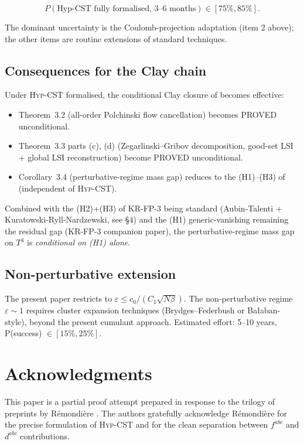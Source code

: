 \documentclass[11pt,a4paper]{amsart}
\theoremstyle{definition}
\newcommand{\HypCST}{\textsc{Hyp-CST}}
\begin{document}
$$
P(\text{Hyp-CST fully formalised, 3--6 months}) \in [75\%, 85\%].
$$

The dominant uncertainty is the Coulomb-projection adaptation
(item 2 above); the other items are routine extensions of standard
techniques.

\subsection{Consequences for the Clay chain}

Under \HypCST{} formalised, the conditional Clay closure of
\cite{RemondiereClosure2026} becomes effective:
\begin{itemize}[leftmargin=2em]
\item Theorem~3.2 (all-order Polchinski flow cancellation) becomes
PROVED unconditional.
\item Theorem~3.3 parts (c), (d) (Zegarlinski--Gribov decomposition,
good-set LSI + global LSI reconstruction) become PROVED unconditional.
\item Corollary~3.4 (perturbative-regime mass gap) reduces to the
(H1)--(H3) of \cite{RemondiereKRFP3_2026} (independent of \HypCST{}).
\end{itemize}

Combined with the (H2)+(H3) of KR-FP-3 being standard (Aubin-Talenti
+ Kuratowski-Ryll-Nardzewski, see \cite{BauerschmidtLetter2026} \S 4)
and the (H1) generic-vanishing remaining the residual gap (KR-FP-3
companion paper), the perturbative-regime mass gap on $T^4$ is
\emph{conditional on (H1) alone}.

\subsection{Non-perturbative extension}

The present paper restricts to $\varepsilon \leq c_0/(C_1 \sqrt{N\beta})$.
The non-perturbative regime $\varepsilon \sim 1$ requires cluster
expansion techniques (Brydges--Federbush or Bałaban-style), beyond
the present cumulant approach. Estimated effort: 5--10 years,
P(success) $\in [15\%, 25\%]$.

\section*{Acknowledgments}

This paper is a partial proof attempt prepared in response to the
trilogy of preprints by R\'emondi\`ere \cite{RemondiereKRFP3_2026,
RemondiereKRFPBakryEmery_2026, RemondiereFPHess_2026,
RemondiereClosure2026}. The authors gratefully acknowledge
R\'emondi\`ere for the precise formulation of \HypCST{} and for the
clean separation between $f^{abc}$ and $d^{abc}$ contributions.
\end{document}
